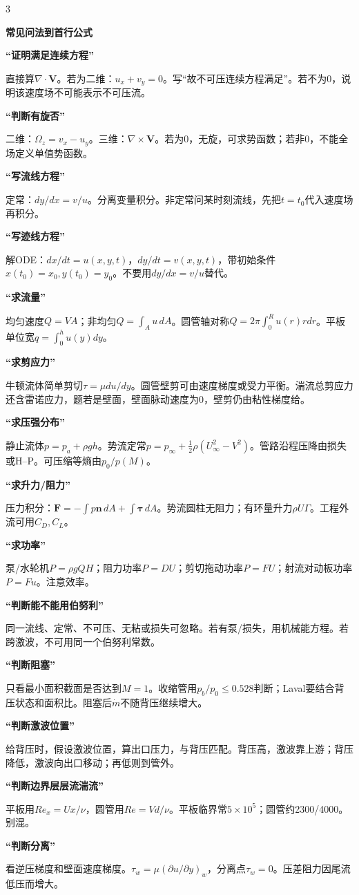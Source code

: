 \documentclass[a4paper]{article}
\newcommand{\qt}[1]{\vspace{0.25pt}\colorbox{Q}{\parbox{\dimexpr\linewidth-2\fboxsep}{\color{white}\bfseries #1}}\par}
\newcommand{\sect}[1]{\qt{#1}}
\begin{document}
\begin{multicols}{3}
{\sect{常见问法到首行公式}
\sect{“证明满足连续方程”}
直接算$\nabla\cdot\bm V$。若为二维：$u_x+v_y=0$。写“故不可压连续方程满足”。若不为0，说明该速度场不可能表示不可压流。
\sect{“判断有旋否”}
二维：$\Omega_z=v_x-u_y$。三维：$\nabla\times\bm V$。若为0，无旋，可求势函数；若非0，不能全场定义单值势函数。
\sect{“写流线方程”}
定常：$dy/dx=v/u$。分离变量积分。非定常问某时刻流线，先把$t=t_0$代入速度场再积分。
\sect{“写迹线方程”}
解ODE：$dx/dt=u(x,y,t)$，$dy/dt=v(x,y,t)$，带初始条件$x(t_0)=x_0,y(t_0)=y_0$。不要用$dy/dx=v/u$替代。
\sect{“求流量”}
均匀速度$Q=VA$；非均匀$Q=\int_Au\,dA$。圆管轴对称$Q=2\pi\int_0^Ru(r)rdr$。平板单位宽$q=\int_0^hu(y)dy$。
\sect{“求剪应力”}
牛顿流体简单剪切$\tau=\mu du/dy$。圆管壁剪可由速度梯度或受力平衡。湍流总剪应力还含雷诺应力，题若是壁面，壁面脉动速度为0，壁剪仍由粘性梯度给。
\sect{“求压强分布”}
静止流体$p=p_a+\rho gh$。势流定常$p=p_\infty+\frac12\rho(U_\infty^2-V^2)$。管路沿程压降由损失或H--P。可压缩等熵由$p_0/p(M)$。
\sect{“求升力/阻力”}
压力积分：$\bm F=-\int p\bm n\,dA+\int\bm\tau\,dA$。势流圆柱无阻力；有环量升力$\rho U\Gamma$。工程外流可用$C_D,C_L$。
\sect{“求功率”}
泵/水轮机$P=\rho gQH$；阻力功率$P=DU$；剪切拖动功率$P=FU$；射流对动板功率$P=Fu$。注意效率。
\sect{“判断能不能用伯努利”}
同一流线、定常、不可压、无粘或损失可忽略。若有泵/损失，用机械能方程。若跨激波，不可用同一个伯努利常数。
\sect{“判断阻塞”}
只看最小面积截面是否达到$M=1$。收缩管用$p_b/p_0\le0.528$判断；Laval要结合背压状态和面积比。阻塞后$\dot m$不随背压继续增大。
\sect{“判断激波位置”}
给背压时，假设激波位置，算出口压力，与背压匹配。背压高，激波靠上游；背压降低，激波向出口移动；再低则到管外。
\sect{“判断边界层层流湍流”}
平板用$Re_x=Ux/\nu$，圆管用$Re=Vd/\nu$。平板临界常$5\times10^5$；圆管约2300/4000。别混。
\sect{“判断分离”}
看逆压梯度和壁面速度梯度。$\tau_w=\mu(\partial u/\partial y)_w$，分离点$\tau_w=0$。压差阻力因尾流低压而增大。

}
\end{multicols}
\end{document}
